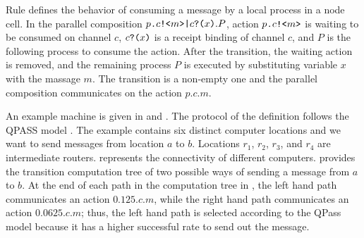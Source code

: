 Rule  defines the behavior of consuming a message by a local process in a node cell.
In the parallel composition $p\texttt{.}c\texttt{!<}m\texttt{>}\texttt{|} c\texttt{?(}x\texttt{)}.P$, action $p\texttt{.}c\texttt{!<}m\texttt{>}$ is waiting to be consumed on channel $c$, 
$c\texttt{?(}x\texttt{)}$ is a receipt binding of channel $c$, and $P$ is the following process to consume the action.
After the transition, the waiting action is removed, and the remaining process $P$ is executed by substituting variable $x$ with the massage $m$. The transition is a non-empty one and the parallel composition communicates on the action $p.c.m$.

An example machine is given in  and .
The protocol of the definition follows the QPASS model \cite{10.1145/3387514.3405853}. 
The example contains six distinct computer locations and we want to send messages from location $a$ to $b$.
Locations $r_1$, $r_2$, $r_3$, and $r_4$ are intermediate routers. 
 represents the connectivity of different computers. 
 provides the transition computation tree of two possible ways of sending a message from $a$ to $b$.
At the end of each path in the computation tree in , the left hand path communicates an action $0.125.c.m$, while the right hand path communicates an action $0.0625.c.m$; thus, the left hand path is selected according to the QPass model because it has a higher successful rate to send out the message.



